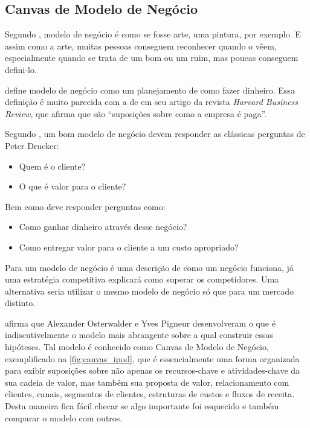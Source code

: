 \subsection{Canvas de Modelo de Negócio}
\label{cha:canvas_de_modelo_de_negocio}
Segundo , modelo de negócio é como se fosse arte, uma pintura, por exemplo. E assim como a arte, muitas pessoas conseguem reconhecer quando o vêem, especialmente quando se trata de um bom ou um ruim, mas poucas conseguem defini-lo.

 define modelo de negócio como um planejamento de como fazer dinheiro. Essa definição é muito parecida com a de  em seu artigo da revista \textit{Harvard Business Review}, que afirma que são \enquote{suposições sobre como a empresa é paga}.

Segundo , um bom modelo de negócio devem responder as clássicas perguntas de Peter Drucker:
\begin{itemize}
\item Quem é o cliente?
\item O que é valor para o cliente?
\end{itemize}
Bem como deve responder perguntas como:
\begin{itemize}
\item Como ganhar dinheiro através desse negócio?
\item Como entregar valor para o cliente a um custo apropriado?
\end{itemize}

Para  um modelo de negócio é uma descrição de como um negócio funciona, já uma estratégia competitiva explicará como superar os competidores. Uma alternativa seria utilizar o mesmo modelo de negócio só que para um mercado distinto.

 afirma que Alexander Osterwalder e Yves Pigneur desenvolveram o que é indiscutivelmente o modelo mais abrangente sobre a qual construir essas hipóteses. Tal modelo é conhecido como Canvas de Modelo de Negócio, exemplificado na \autoref{fig:canvas_ipod}, que é essencialmente uma forma organizada para exibir suposições sobre não apenas os recursos-chave e atividades-chave da sua cadeia de valor, mas também sua proposta de valor, relacionamento com clientes, canais, segmentos de clientes, estruturas de custos e fluxos de receita. Desta maneira fica fácil checar se algo importante foi esquecido e também  comparar o modelo com outros.

